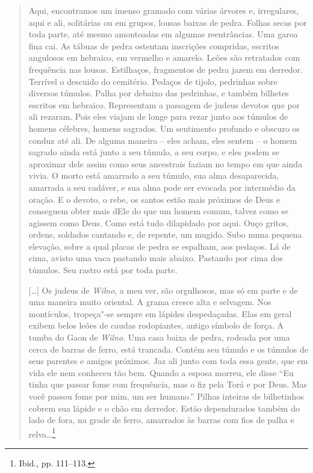 \begin{quote}
Aqui, encontramos um imenso gramado com várias árvores e, irregulares,
aqui e ali, solitárias ou em grupos, lousas baixas de pedra. Folhas
secas por toda parte, até mesmo amontoadas em algumas reentrâncias. Uma
garoa fina cai. As tábuas de pedra ostentam inscrições compridas,
escritos angulosos em hebraico, em vermelho e amarelo. Leões são
retratados com frequência nas lousas. Estilhaços, fragmentos de pedra
jazem em derredor. Terrível o descuido do cemitério. Pedaços de tijolo,
pedrinhas sobre diversos túmulos. Palha por debaixo das pedrinhas, e
também bilhetes escritos em hebraico. Representam a passagem de judeus
devotos que por ali rezaram. Pois eles viajam de longe para rezar junto
aos túmulos de homens célebres, homens sagrados. Um sentimento profundo
e obscuro os conduz até ali. De alguma maneira -- eles acham, eles sentem
-- o homem sagrado ainda está junto a seu túmulo, a seu corpo, e eles
podem se aproximar dele assim como seus ancestrais faziam no tempo em
que ainda vivia. O morto está amarrado a seu túmulo, sua alma
desaparecida, amarrada a seu cadáver, e sua alma pode ser evocada por
intermédio da oração. E o devoto, o rebe, os santos estão mais próximos
de Deus e conseguem obter mais dEle do que um homem comum, talvez como
se agissem como Deus. Como está tudo dilapidado por aqui. Ouço gritos,
ordens, soldados cantando e, de repente, um mugido. Subo numa pequena
elevação, sobre a qual placas de pedra se espalham, aos pedaços. Lá de
cima, avisto uma vaca pastando mais abaixo. Pastando por cima dos
túmulos. Seu rastro está por toda parte.

[\ldots{}] Os judeus de \textit{Wilno}, a meu ver, são orgulhosos, mas só em parte
e de uma maneira muito oriental. A grama cresce alta e selvagem. Nos
montículos, tropeça"-se sempre em lápides despedaçadas. Elas em geral
exibem belos leões de caudas rodopiantes, antigo símbolo de força. A
tumba do Gaon de \textit{Wilno}. Uma casa baixa de pedra, rodeada por uma cerca
de barras de ferro, está trancada. Contém seu túmulo e os túmulos de
seus parentes e amigos próximos. Jaz ali junto com toda essa gente, que
em vida ele nem conheceu tão bem. Quando a esposa morreu, ele disse ``Eu
tinha que passar fome com frequência, mas o fiz pela Torá e por Deus.
Mas você passou fome por mim, um ser humano.'' Pilhas inteiras de
bilhetinhos cobrem sua lápide e o chão em derredor. Estão dependurados
também do lado de fora, na grade de ferro, amarrados às barras com fios
de palha e relva\ldots{}\footnote{Ibid., pp. 111--113.}
\end{quote}

